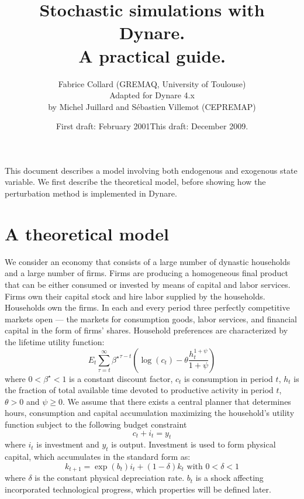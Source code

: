 \documentclass[11pt,a4paper]{article}
\begin{document}
\title{Stochastic simulations with {\sc Dynare}. \\ A practical guide.}
\author{Fabrice Collard (GREMAQ, University of Toulouse)\\Adapted for Dynare 4.x\\ by Michel Juillard and S\'ebastien Villemot (CEPREMAP)}
\date{First draft: February 2001\hspace{10mm}This draft: December 2009.}
\maketitle
This document describes a model involving both endogenous and exogenous state variable. We first describe the theoretical model, before showing how the perturbation method is implemented in {\sc Dynare}.

\section{A theoretical model}
We consider an economy that consists of a large number of dynastic households and a large number of firms. Firms are producing a homogeneous final product that can be either consumed or invested by means of capital and labor services. Firms own their capital stock and hire labor supplied by the households. Households own the firms. In each and every period three perfectly competitive markets open --- the markets for consumption goods, labor services, and financial capital in the form of firms' shares.
Household preferences are characterized by the lifetime utility function:
\begin{equation}
  E_t\sum_{\tau=t}^{\infty}{\beta^\star}^{\tau-t} \left(\log(c_t)-\theta\frac{h_t^{1+\psi}}{1+\psi}\right)
  \label{eq:ut}
\end{equation}
\noindent where $0<\beta^\star<1$ is a constant discount factor, $c_t$ is consumption in period
$t$, $h_t$ is the fraction of total available time devoted to productive activity in period $t$, $\theta>0$ and $\psi\geqslant 0$. We assume that there exists a central planner that determines hours, consumption and capital accumulation maximizing the household's utility function subject to the following budget constraint
\begin{equation}
  c_t+i_t=y_t
  \label{eq:bud}
\end{equation}
\noindent where $i_t$ is investment and $y_t$ is output. Investment is used to form physical capital, which accumulates in the standard form as:
\begin{equation}
k_{t+1}=\exp(b_t) i_t+(1-\delta)k_t \mbox{ with } 0<\delta<1
\label{eq:acc}
\end{equation}
where $\delta$ is the constant physical depreciation rate. $b_t$ is a shock affecting incorporated technological progress, which properties will be defined later.
\end{document}

